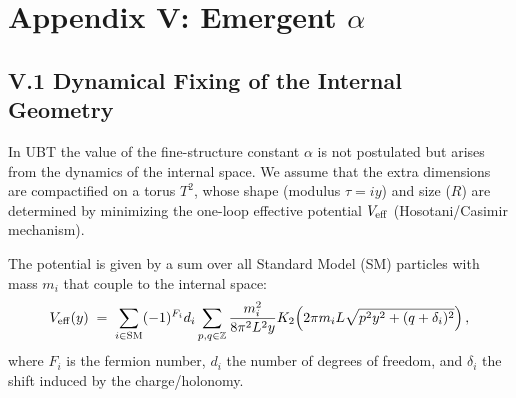 
\appendix
\section*{Appendix V: Emergent $\alpha$}

\vspace{1em}
\noindent{}
\vspace{1em}

\subsection*{V.1 Dynamical Fixing of the Internal Geometry}
In UBT the value of the fine-structure constant $\alpha$ is not postulated but arises from the dynamics of the internal space. 
We assume that the extra dimensions are compactified on a torus $T^2$, whose shape (modulus $\tau=i y$) and size ($R$) are determined by minimizing the one-loop effective potential $V_{\rm eff}$ (Hosotani/Casimir mechanism).




The potential is given by a sum over all Standard Model (SM) particles with mass $m_i$ that couple to the internal space:
\begin{equation}
V_{\rm eff}(y) \;=\; \sum_{i \in \text{SM}} (-1)^{F_i} d_i 
  \sum_{p,q \in \mathbb{Z}} \frac{m_i^2}{8\pi^2 L^2 y} 
  K_2\!\left(2\pi m_i L \sqrt{p^2 y^2 + (q+\delta_i)^2}\right),
\end{equation}
where $F_i$ is the fermion number, $d_i$ the number of degrees of freedom, and $\delta_i$ the shift induced by the charge/holonomy.

